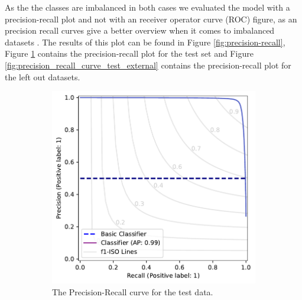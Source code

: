 \documentclass[a4paper, 12pt, oneside]{book} %
\begin{document}
As the the classes are imbalanced in both cases we  evaluated the model with a precision-recall plot and not with an receiver operator curve (ROC) figure, as an precision recall curves give a better overview when it comes to imbalanced datasets \autocite{saito_precision-recall_2015}.
The results of this plot can be found in Figure \ref{fig:precision-recall}, Figure \ref{fig:precision_recall_curve_test} contains the precision-recall plot for the test set and Figure \ref{fig:precision_recall_curve_test_external} contains the precision-recall plot for the left out datasets.
\begin{figure} [h!]
     \centering
     \begin{subfigure}[b]{0.49\textwidth}
         \centering
         \includegraphics[width=\textwidth]{precision_recall_plot.pdf}
         \caption{The Precision-Recall curve for the test data.}
         \label{fig:precision_recall_curve_test}
     \end{subfigure}
     \hfill
     \begin{subfigure}[b]{0.49\textwidth}
         \centering

\end{subfigure}
\end{figure}
\end{document}

